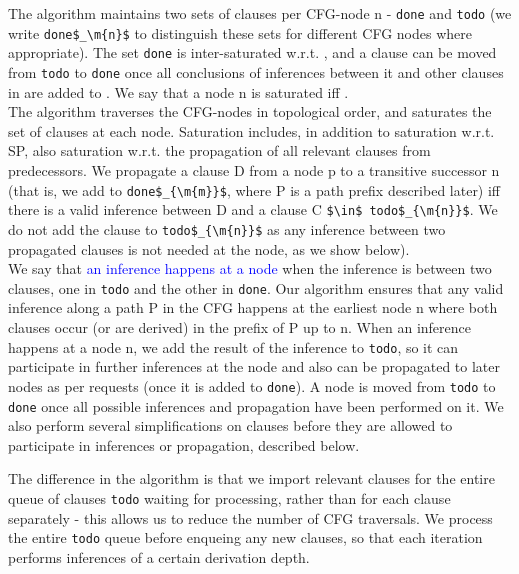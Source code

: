 The algorithm maintains two sets of clauses per CFG-node n - \lstinline|done| and \lstinline|todo| (we write \lstinline|done$_\m{n}$| to distinguish these sets for different CFG nodes where appropriate). 
The set \lstinline{done} is inter-saturated w.r.t. \SPG, and a clause can be moved from \lstinline{todo} to \lstinline{done} once all conclusions of inferences between it and other clauses in  are added to . We say that a node n is saturated iff .\\
The algorithm traverses the CFG-nodes in topological order, and saturates the set of clauses at each node. 
Saturation includes, in addition to saturation w.r.t. SP, also saturation w.r.t. the propagation of all relevant clauses from predecessors.
We propagate a clause D from a node p to a transitive successor n (that is, we add  to \lstinline|done$_{\m{m}}$|, where P is a path prefix described later) iff there is a valid inference between D and a clause C \lstinline|$\in$ todo$_{\m{n}}$|. We do not add the clause to \lstinline|todo$_{\m{n}}$| as any inference between two propagated clauses is not needed at the node, as we show below). \\
We say that \textcolor{blue}{an inference happens at a node} when the inference is between two clauses, one in \lstinline|todo| and the other in \lstinline|done|. Our algorithm ensures that any valid inference along a path P in the CFG happens at the earliest node n where both clauses occur (or are derived) in the prefix of P up to n.
When an inference happens at a node n, we add the result of the inference to \lstinline|todo|, so it can participate in further inferences at the node and also can be propagated to later nodes as per requests (once it is added to \lstinline|done|).
A node is moved from \lstinline|todo| to \lstinline|done| once all possible inferences and propagation have been performed on it.
We also perform several simplifications on clauses before they are allowed to participate in inferences or propagation, described below.

The difference in the algorithm is that we import relevant clauses for the entire queue of clauses \lstinline|todo| waiting for processing, rather than for each clause separately - this allows us to reduce the number of CFG traversals. We process the entire \lstinline|todo| queue before enqueing any new clauses, so that each iteration performs inferences of a certain derivation depth.

